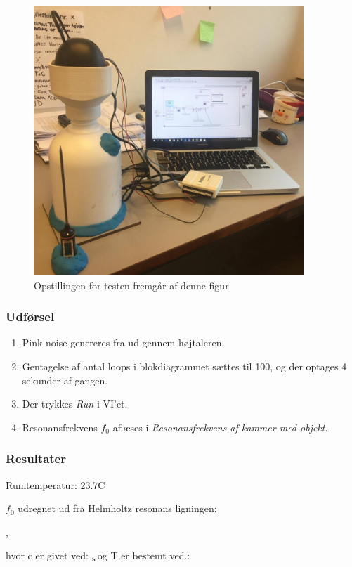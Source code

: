 	\begin{figure}[htb]
	\centering
		\includegraphics[width=4in]{bordtest61.jpg}	
		\caption{Opstillingen for testen fremgår af denne figur}
		\label{bordetest61op}
	\end{figure}
	
		\subsubsection{Udførsel}
			
			\begin{enumerate}
			\item Pink noise genereres fra \onlineg  ud gennem højtaleren. 
			\item Gentagelse af antal loops i blokdiagrammet sættes til 100, og der optages 4 sekunder af gangen. 
			\item Der trykkes \textit{Run} i VI'et. 
			\item Resonansfrekvens $f_{0}$ aflæses i \textit{Resonansfrekvens af kammer med objekt}.
			\end{enumerate}
			
	\subsubsection{Resultater}
	
	Rumtemperatur: 23.7\degree C
	
	$f_{0}$ udregnet ud fra Helmholtz resonans ligningen:
	
		\fnul,
		
		hvor c er givet ved: 
		\c, og T er bestemt ved.: 
		\T
		
